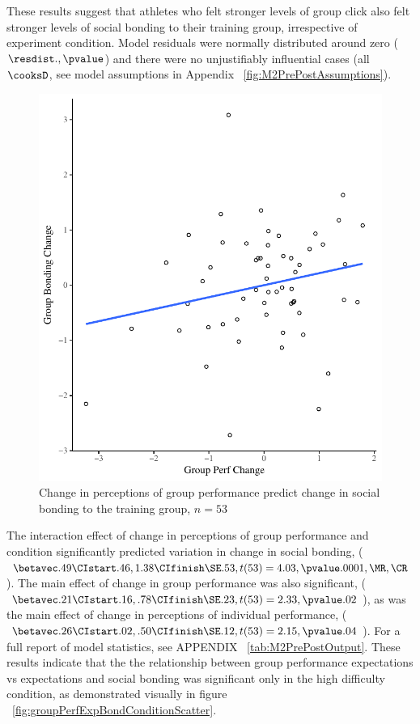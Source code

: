These results suggest that athletes who felt stronger levels of group click also felt stronger levels of social bonding to their training group, irrespective of experiment condition.  Model residuals were normally distributed around zero ($\resdist ., \pvalue $) and there were no unjustifiably influential cases (all $\cooksD $, see model assumptions in Appendix ~\ref{fig:M2PrePostAssumptions}).






\begin{figure}
  \centering
  \includegraphics[width=0.5\linewidth,keepaspectratio] {images/groupPerfBondingChangeCondition}
  \caption{Change in perceptions of group performance predict change in social bonding to the training group, $n = 53$}
 \label{fig:groupPerfBondingChangeCondition}
\end{figure}

The interaction effect of change in perceptions of group performance and condition significantly predicted variation in change in social bonding, ($\betavec .49 \CIstart .46, 1.38 \CIfinish \SE .53, t(53) = 4.03, \pvalue .0001, \MR , \CR $). The main effect of change in group performance was also significant, ($\betavec .21 \CIstart .16, .78 \CIfinish \SE.23, t(53) = 2.33, \pvalue .02$), as was the main effect of change in perceptions of individual performance, ($\betavec .26 \CIstart .02, .50 \CIfinish \SE.12, t(53) = 2.15, \pvalue .04$).
For a full report of model statistics, see APPENDIX ~\ref{tab:M2PrePostOutput}.  These results indicate that the the relationship between group performance expectations vs expectations and social bonding was significant only in the high difficulty condition, as demonstrated visually in figure ~\ref{fig:groupPerfExpBondConditionScatter}.

